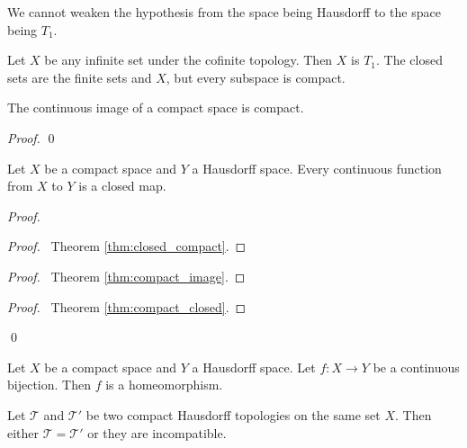 \begin{ex}
We cannot weaken the hypothesis from the space being Hausdorff to the space being $T_1$.

Let $X$ be any infinite set under the cofinite topology. Then $X$ is $T_1$. The closed sets are the finite sets and $X$, but every subspace is compact.
\end{ex}

\begin{thm}
\label{thm:compact_image}
The continuous image of a compact space is compact.
\end{thm}

\begin{proof}
\pf
{}
\qed
\end{proof}

\begin{prop}
Let $X$ be a compact space and $Y$ a Hausdorff space. Every continuous function from $X$ to $Y$ is a closed map.
\end{prop}

\begin{proof}
\pf
{}
\begin{proof}
	\pf\ Theorem \ref{thm:closed_compact}.
\end{proof}
\begin{proof}
	\pf\ Theorem \ref{thm:compact_image}.
\end{proof}
\begin{proof}
	\pf\ Theorem \ref{thm:compact_closed}.
\end{proof}
\qed
\end{proof}

\begin{cor}
Let $X$ be a compact space and $Y$ a Hausdorff space. Let $f : X \rightarrow Y$ be a continuous bijection. Then $f$ is a homeomorphism.
\end{cor}

\begin{cor}
Let $\mathcal{T}$ and $\mathcal{T}'$ be two compact Hausdorff topologies on the same set $X$. Then either $\mathcal{T} = \mathcal{T}'$ or they are incompatible.
\end{cor}

